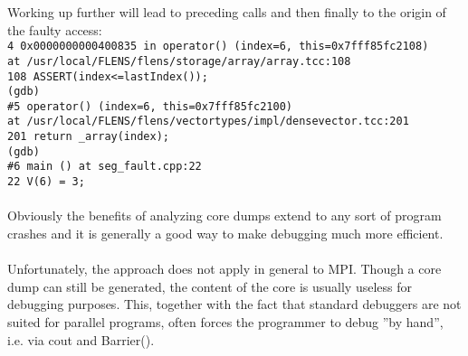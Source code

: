 Working up further will lead to preceding calls and then finally to the origin of the faulty access:\\
\texttt{\footnotesize{4  0x0000000000400835 in operator() (index=6, this=0x7fff85fc2108)\\
    at /usr/local/FLENS/flens/storage/array/array.tcc:108\\
108	    ASSERT(index<=lastIndex());\\
(gdb) \\
\#5  operator() (index=6, this=0x7fff85fc2100)\\
    at /usr/local/FLENS/flens/vectortypes/impl/densevector.tcc:201\\
201	    return \_array(index);\\
(gdb) \\
\#6  main () at seg\_fault.cpp:22\\
22		V(6) = 3;}}\\\\
Obviously the benefits of analyzing core dumps extend to any sort of program crashes and it is generally a good way to make debugging much more efficient.\\\\
Unfortunately, the approach does not apply in general to MPI. Though a core dump can still be generated, the content of the core is usually useless for debugging purposes. This, together with the fact that standard debuggers are not suited for parallel programs, often forces the programmer to debug ''by hand'', i.e. via cout and Barrier().

\newpage

